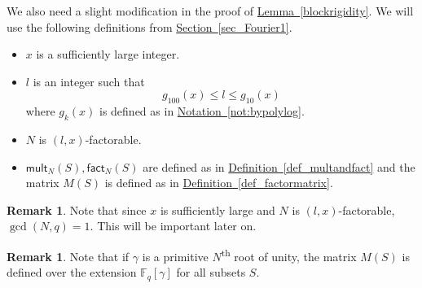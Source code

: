 \documentclass[11pt]{article}
\numberwithin{equation}{section}
\theoremstyle{definition}
\newtheorem{remark}[theorem]{Remark}
\theoremstyle{plain}
\newcommand{\expref}[2]{\hyperref[#2]{#1~\ref{#2}}}
\theoremstyle{definition}
\newcommand\F{{\mathbb{F}}}
\renewcommand\fact{\textsf{fact}}
\newcommand\mult{\textsf{mult}}
\newcommand{\ts}{\textsuperscript}
\begin{document}
We also need a slight modification in the proof of \expref{Lemma}{blockrigidity}.  We will use the following definitions from \expref{Section}{sec_Fourier1}.
\begin{itemize}
\item $x$ is a sufficiently large integer.
\item $l$ is an integer such that 
\[
g_{100}(x) \leq l \leq g_{10}(x)
\]
where $g_k(x)$ is defined as in \expref{Notation}{not:bypolylog}.
\item $N$ is $(l,x)$-factorable.
\item $\mult_N(S), \fact_N(S)$ are defined as in \expref{Definition}{def_multandfact} and the matrix $M(S)$ is defined as in \expref{Definition}{def_factormatrix}.
\end{itemize}
\begin{remark}
Note that since $x$ is sufficiently large and $N$ is $(l,x)$-factorable, $\gcd(N,q) = 1$.  This will be important later on.  
\end{remark}
\begin{remark}
Note that if $\gamma$ is a primitive $N$\ts{th} root of unity, the matrix $M(S)$ is defined over the extension $\F_q[\gamma]$ for all subsets $S$.
\end{remark}
\end{document}
